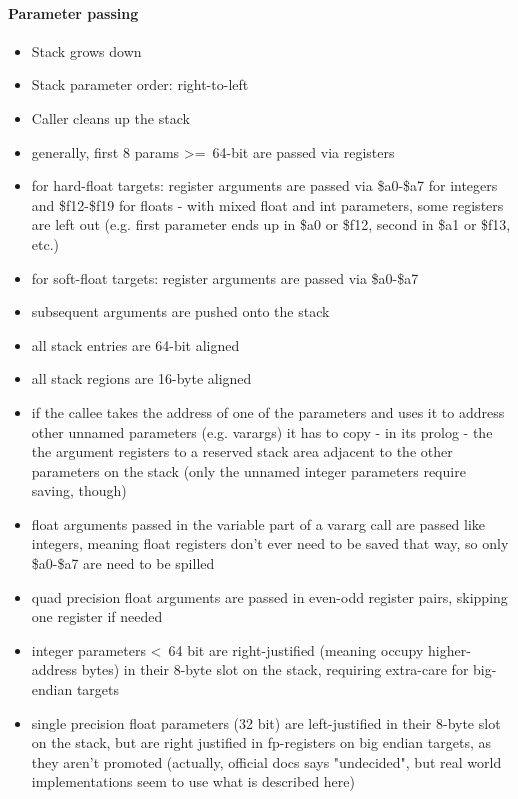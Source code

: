 \paragraph{Parameter passing}

\begin{itemize}
\item Stack grows down
\item Stack parameter order: right-to-left
\item Caller cleans up the stack
\item generally, first 8 params \textgreater=\ 64-bit are passed via registers
\item for hard-float targets: register arguments are passed via \$a0-\$a7 for integers and \$f12-\$f19 for floats - with mixed float and int parameters, some registers are left out (e.g. first parameter ends up in \$a0 or \$f12, second in \$a1 or \$f13, etc.)
\item for soft-float targets: register arguments are passed via \$a0-\$a7
\item subsequent arguments are pushed onto the stack
\item all stack entries are 64-bit aligned
\item all stack regions are 16-byte aligned
\item if the callee takes the address of one of the parameters and uses it to address other unnamed parameters (e.g. varargs) it has to copy - in its prolog - the the argument registers to a reserved stack area adjacent to the other parameters on the stack (only the unnamed integer parameters require saving, though) %
\item float arguments passed in the variable part of a vararg call are passed like integers, meaning float registers don't ever need to be saved that way, so only \$a0-\$a7 are need to be spilled
\item quad precision float arguments are passed in even-odd register pairs, skipping one register if needed
\item integer parameters \textless\ 64 bit are right-justified (meaning occupy higher-address bytes) in their 8-byte slot on the stack, requiring extra-care for big-endian targets
\item single precision float parameters (32 bit) are left-justified in their 8-byte slot on the stack, but are right justified in fp-registers on big endian targets, as they aren't promoted (actually, official docs says "undecided", but real world implementations seem to use what is described here)

\end{itemize}
